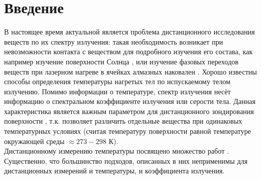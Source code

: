 \begin{abstract}
  The paper describes an analytical approach for determining the measurement errors of temperature and emissivity of a heated body when these parameters are measured remotely. Remote methods for determining the temperature on the surface of heated bodies are carried out by measuring the intensity of thermal radiation emitted by the sample. The adjustment of the experimentally measured thermal radiation spectrum and the theoretical curve (Planck's law) using the least squares method makes it possible to determine the sample temperature during laser heating. Despite the widespread use of Planck's law for remote temperature measurement, the problem of high measurement error persists. This paper presents a brief analysis of the errors of the least squares method (LSM) obtained by remote measurement of temperature and thermal radiation coefficient using the Planck formula. The result of this work is an algorithm for determining the optimal wavelength interval for measuring temperature and emissivity in the gray body approximation. This algorithm can have practical application in the design of devices for remote measurement of temperature and emissivity.
\emph{Keywords:} {emissivity, approaching the gray body, least squares method, Planck's law.}
\end{abstract}


\section{Введение}

В настоящее время актуальной является проблема дистанционного исследования веществ по их спектру излучения: такая необходимость возникает при невозможности контакта с веществом для подробного изучения его состава, как например изучение поверхности Солнца \cite{1}, или изучение фазовых переходов веществ при лазерном нагреве в ячейках алмазных наковален \cite{2,3}. Хорошо известны способы определения температуры нагретых тел по испускаемому телом излучению. Помимо информации о температуре, спектр излучения несёт информацию о спектральном коэффициенте излучения или серости тела. Данная характеристика является важным параметром для дистанционного зондирования поверхности \cite{4}, т.к. позволяет различить отдельные вещества при одинаковых температурных условиях (считая температуру поверхности равной температуре окружающей среды $\approx 273 - 298$ К).\\
Дистанционному измерению температуры посвящено множество работ \cite{2,3,4,5,6,7,8,9,10}. Существенно, что большинство подходов, описанных в них неприменимы для дистанционных измерений и температуры, и коэффициента излучения.

